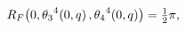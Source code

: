 \[\mathop{R_{F}\/}\nolimits\!\left(0,{\mathop{\theta_{3}\/}\nolimits^{4}}\!\left%
(0,q\right),{\mathop{\theta_{4}\/}\nolimits^{4}}\!\left(0,q\right)\right)=%
\tfrac{1}{2}\pi,\]